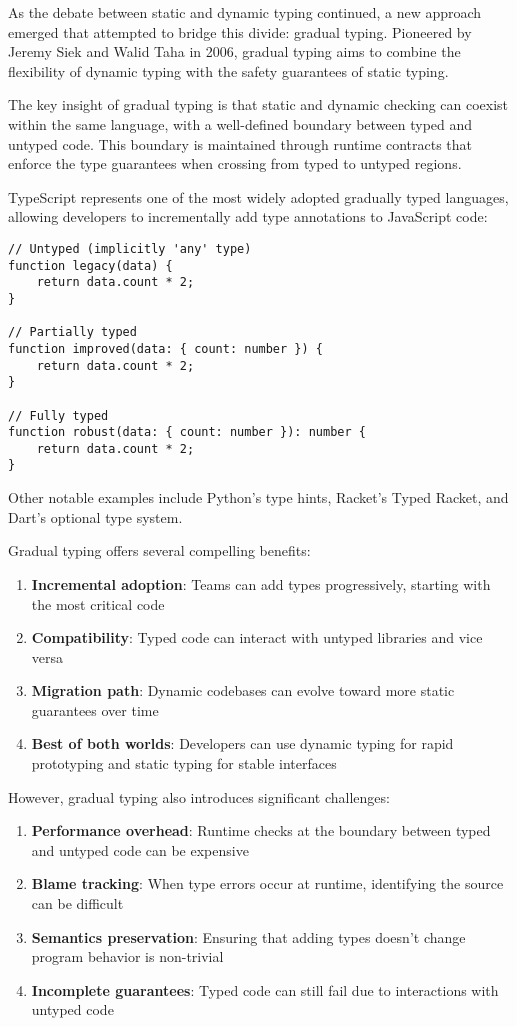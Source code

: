 \documentclass[11pt]{article}
\begin{document}
As the debate between static and dynamic typing continued, a new approach emerged that attempted to bridge this divide: gradual typing. Pioneered by Jeremy Siek and Walid Taha in 2006, gradual typing aims to combine the flexibility of dynamic typing with the safety guarantees of static typing.

The key insight of gradual typing is that static and dynamic checking can coexist within the same language, with a well-defined boundary between typed and untyped code. This boundary is maintained through runtime contracts that enforce the type guarantees when crossing from typed to untyped regions.

TypeScript represents one of the most widely adopted gradually typed languages, allowing developers to incrementally add type annotations to JavaScript code:

\begin{verbatim}
// Untyped (implicitly 'any' type)
function legacy(data) {
    return data.count * 2;
}

// Partially typed
function improved(data: { count: number }) {
    return data.count * 2;
}

// Fully typed
function robust(data: { count: number }): number {
    return data.count * 2;
}
\end{verbatim}

Other notable examples include Python's type hints, Racket's Typed Racket, and Dart's optional type system.

Gradual typing offers several compelling benefits:

\begin{enumerate}
\item \textbf{Incremental adoption}: Teams can add types progressively, starting with the most critical code
\item \textbf{Compatibility}: Typed code can interact with untyped libraries and vice versa
\item \textbf{Migration path}: Dynamic codebases can evolve toward more static guarantees over time
\item \textbf{Best of both worlds}: Developers can use dynamic typing for rapid prototyping and static typing for stable interfaces
\end{enumerate}

However, gradual typing also introduces significant challenges:

\begin{enumerate}
\item \textbf{Performance overhead}: Runtime checks at the boundary between typed and untyped code can be expensive
\item \textbf{Blame tracking}: When type errors occur at runtime, identifying the source can be difficult
\item \textbf{Semantics preservation}: Ensuring that adding types doesn't change program behavior is non-trivial
\item \textbf{Incomplete guarantees}: Typed code can still fail due to interactions with untyped code
\end{enumerate}
\end{document}
